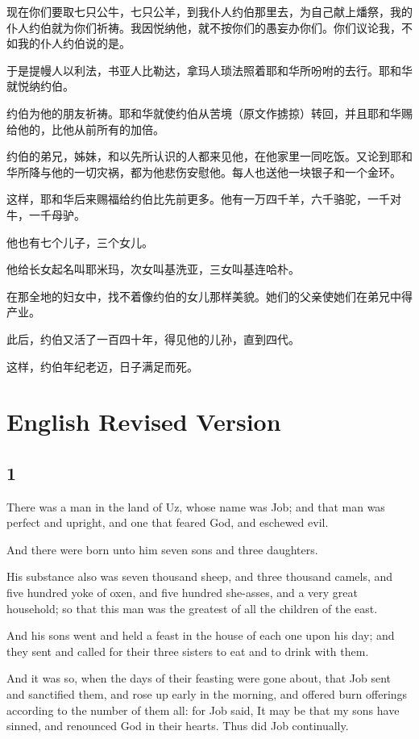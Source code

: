 \documentclass[12pt,oneside]{book}
\begin{document}
现在你们要取七只公牛，七只公羊，到我仆人约伯那里去，为自己献上燔祭，我的仆人约伯就为你们祈祷。我因悦纳他，就不按你们的愚妄办你们。你们议论我，不如我的仆人约伯说的是。

于是提幔人以利法，书亚人比勒达，拿玛人琐法照着耶和华所吩咐的去行。耶和华就悦纳约伯。

约伯为他的朋友祈祷。耶和华就使约伯从苦境（原文作掳掠）转回，并且耶和华赐给他的，比他从前所有的加倍。

约伯的弟兄，姊妹，和以先所认识的人都来见他，在他家里一同吃饭。又论到耶和华所降与他的一切灾祸，都为他悲伤安慰他。每人也送他一块银子和一个金环。

这样，耶和华后来赐福给约伯比先前更多。他有一万四千羊，六千骆驼，一千对牛，一千母驴。

他也有七个儿子，三个女儿。

他给长女起名叫耶米玛，次女叫基洗亚，三女叫基连哈朴。

在那全地的妇女中，找不着像约伯的女儿那样美貌。她们的父亲使她们在弟兄中得产业。

此后，约伯又活了一百四十年，得见他的儿孙，直到四代。

这样，约伯年纪老迈，日子满足而死。


\part{English Revised Version}
\chapter{1}
There was a man in the land of Uz, whose name was Job; and that man was perfect and upright, and one that feared God, and eschewed evil.

And there were born unto him seven sons and three daughters.

His substance also was seven thousand sheep, and three thousand camels, and five hundred yoke of oxen, and five hundred she-asses, and a very great household; so that this man was the greatest of all the children of the east.

And his sons went and held a feast in the house of each one upon his day; and they sent and called for their three sisters to eat and to drink with them.

And it was so, when the days of their feasting were gone about, that Job sent and sanctified them, and rose up early in the morning, and offered burn offerings according to the number of them all: for Job said, It may be that my sons have sinned, and renounced God in their hearts. Thus did Job continually.
\end{document}
